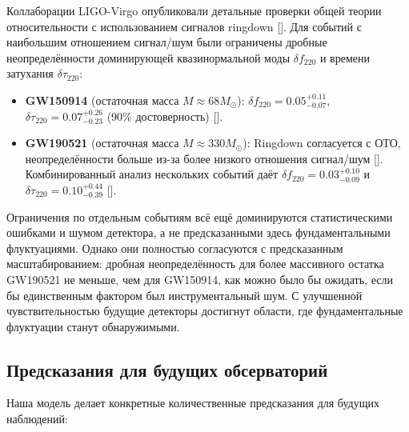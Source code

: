 \documentclass[12pt,a4paper]{article}
\begin{document}
	Коллаборации LIGO-Virgo опубликовали детальные проверки общей теории относительности с использованием сигналов ringdown [\cite{LIGO2021, Ghosh2021}]. Для событий с наибольшим отношением сигнал/шум были ограничены дробные неопределённости доминирующей квазинормальной моды \(\delta f_{220}\) и времени затухания \(\delta \tau_{220}\):
	
	\begin{itemize}
		\item \textbf{GW150914} (остаточная масса \(M \approx 68 M_\odot\)): \(\delta f_{220} = 0.05^{+0.11}_{-0.07}\), \(\delta \tau_{220} = 0.07^{+0.26}_{-0.23}\) (90\% достоверность) [\cite{Ghosh2021}].
		\item \textbf{GW190521} (остаточная масса \(M \approx 330 M_\odot\)): Ringdown согласуется с ОТО, неопределённости больше из-за более низкого отношения сигнал/шум [\cite{Abbott2020b}]. Комбинированный анализ нескольких событий даёт \(\delta f_{220} = 0.03^{+0.10}_{-0.09}\) и \(\delta \tau_{220} = 0.10^{+0.44}_{-0.39}\) [\cite{Ghosh2021}].
	\end{itemize}
	
	Ограничения по отдельным событиям всё ещё доминируются статистическими ошибками и шумом детектора, а не предсказанными здесь фундаментальными флуктуациями. Однако они полностью согласуются с предсказанным масштабированием: дробная неопределённость для более массивного остатка GW190521 не меньше, чем для GW150914, как можно было бы ожидать, если бы единственным фактором был инструментальный шум. С улучшенной чувствительностью будущие детекторы достигнут области, где фундаментальные флуктуации станут обнаружимыми.
	
	\subsection{Предсказания для будущих обсерваторий}
	
	Наша модель делает конкретные количественные предсказания для будущих наблюдений:
	
\end{document}
